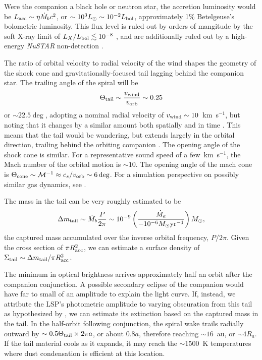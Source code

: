 \documentclass[twocolumn]{aastex631}
\begin{document}
Were the companion a black hole or neutron star, the accretion luminosity would be $L_{\rm acc}\sim \eta \dot M_b c^2$, or $\sim 10^3 L_\odot \sim 10^{-2} L_{\rm bol}$, approximately 1\% Betelgeuse's bolometric luminosity. This flux level is ruled out by orders of mangitude by the soft X-ray limit of $L_X/L_{\rm bol}\lesssim10^{-8}$  \citep{2020ATel13501....1K}, and are additionally ruled out by a high-energy {\it NuSTAR} non-detection \citep{2021PhRvL.126c1101X}. 

The ratio of orbital velocity to radial velocity of the wind shapes the geometry of the shock cone and gravitationally-focused tail lagging behind the companion star. The trailing angle of the spiral will be 
\begin{equation}
    \Theta_{\rm tail} \sim \frac{v_{\rm wind}}{v_{\rm orb}} \sim 0.25
\end{equation}
or $\sim 22.5 \deg$, adopting a nominal radial velocity of $v_{\rm wind}\sim 10$~km~s$^{-1}$, but noting that it changes by a similar amount both spatially and in time  \citep{1987ApJ...317L..85D,2000ApJ...545..454L,2001ApJ...558..815L}. This means that the tail would be wandering, but extends largely in the orbital direction, trailing behind the orbiting companion \citep[e.g. on larger scales][]{2020Sci...369.1497D}. The opening angle of the shock cone is similar. For a representative sound speed of a few~km~s$^{-1}$, the Mach number of the orbital motion is $\sim 10$. The opening angle of the mach cone is $\Theta_{\rm cone}\sim \mathcal{M}^{-1} \approx c_s / v_{\rm orb} \sim 6 \deg$. For a simulation perspective on possibly similar gas dynamics, see \citet{2020ApJ...892..110C}.  



The mass in the tail can be very roughly estimated to be 
\begin{equation}
    \Delta m_{\rm tail} \sim \dot M_b \frac{P}{2\pi} \sim 10^{-9} \left(\frac{\dot M_a}{-10^{-6} M_\odot{\rm yr}^{-1}} \right)   M_\odot,
\end{equation}
the captured mass accumulated over the inverse orbital frequency, $P/2\pi$. Given the cross section of $\pi R_{\rm acc}^2$, we can estimate a surface density of $\Sigma_{\rm tail} \sim \Delta m_{\rm tail} / \pi R_{\rm acc}^2$. 

The minimum in optical brightness arrives approximately half an orbit after the companion conjunction. A possible secondary eclipse of the companion would have far to small of an amplitude to explain the light curve. 
If, instead, we attribute the LSP's photometric amplitude to varying obscuration from this tail as hypothesized by \citet{2021ApJ...911L..22S}, we can estimate its extinction based on the captured mass in the tail.
 In the half-orbit following conjunction, the spiral wake trails radially outward by $\sim 0.5 \Theta_{\rm tail} \times 2\pi a$, or about $0.8a$, therefore reaching $\sim 16$~au, or $\sim 4R_a$. If the tail material cools as it expands, it may reach the $\sim 1500$~K temperatures where dust condensation is efficient at this location. 
 
\end{document}
